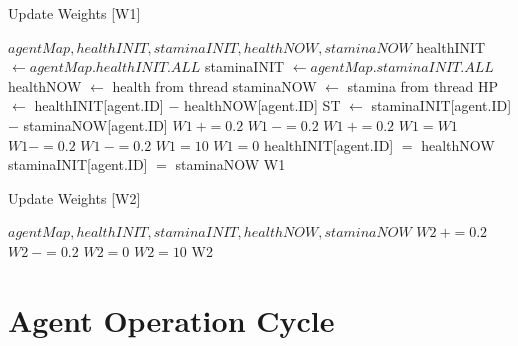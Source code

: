 
\begin{algorithm}
\caption{Update Weights [W1]}\label{alg:6}
\begin{algorithmic} 
\scriptsize
\Require $agentMap, healthINIT, staminaINIT,healthNOW, staminaNOW$
\State healthINIT $\leftarrow agentMap.healthINIT.ALL$
\State staminaINIT $\leftarrow agentMap.staminaINIT.ALL$
\State healthNOW $\leftarrow$ health from thread
\State staminaNOW $\leftarrow$ stamina from thread
\State HP $\leftarrow$ healthINIT[agent.ID] $-$ healthNOW[agent.ID]
\State ST $\leftarrow$ staminaINIT[agent.ID] $-$ staminaNOW[agent.ID]
\State $W1~+= 0.2$
\Else
\State $W1~-= 0.2$
\EndIf
{}
\State $W1~+= 0.2$
\Else
{}
\State $W1 = W1$
\Else
\State $W1 -= 0.2$
\EndIf
\State $W1~-= 0.2$
\EndIf
{}
\State $W1=10$
\EndIf
{}
\State $W1 = 0$
\EndIf
\State healthINIT[agent.ID] $=$ healthNOW
\State staminaINIT[agent.ID] $=$ staminaNOW
\Return W1
\EndIf
\end{algorithmic}
\end{algorithm}



\begin{algorithm}
\caption{Update Weights [W2]}\label{alg:7}
\begin{algorithmic} 
\scriptsize
\Require $agentMap, healthINIT, staminaINIT,healthNOW, staminaNOW$
\State $W2~+= 0.2$
\Else
\State $W2~-= 0.2$
\EndIf
{}
\State $W2 = 0$
\EndIf
{}
\State $W2 = 10$
\EndIf
\State
\Return W2
\end{algorithmic}
\end{algorithm}

\clearpage
\section{Agent Operation Cycle}


